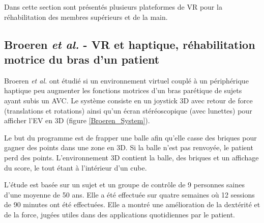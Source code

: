 	Dans cette section sont présentés plusieurs plateformes de VR pour la réhabilitation des membres supérieurs et de la main.


	\subsection*{Broeren \textit{et al.} - VR et haptique, réhabilitation motrice du bras d'un patient}
		Broeren \textit{et al.} \cite{Broeren_VRHaptic} ont étudié si un environnement virtuel couplé à un périphérique haptique peu augmenter les fonctions motrices d'un bras parétique de sujets ayant subis un AVC. Le système consiste en un joystick 3D avec retour de force (translations et rotations) ainsi qu'un écran stéréoscopique (avec lunettes) pour afficher l'EV en 3D (figure \ref{Broeren_System}).
		
		Le but du programme est de frapper une balle afin qu'elle casse des briques pour gagner des points dans une zone en 3D. Si la balle n'est pas renvoyée, le patient perd des points. L'environnement 3D contient la balle, des briques et un affichage du score, le tout étant à l'intérieur d'un cube. 
		
		L'étude est basée sur un sujet et un groupe de contrôle de 9 personnes saines d'une moyenne de 50 ans. Elle a été effectuée sur quatre semaines où 12 sessions de 90 minutes ont été effectuées. Elle a montré une amélioration de la dextérité et de la force, jugées utiles dans des applications quotidiennes par le patient.
		
